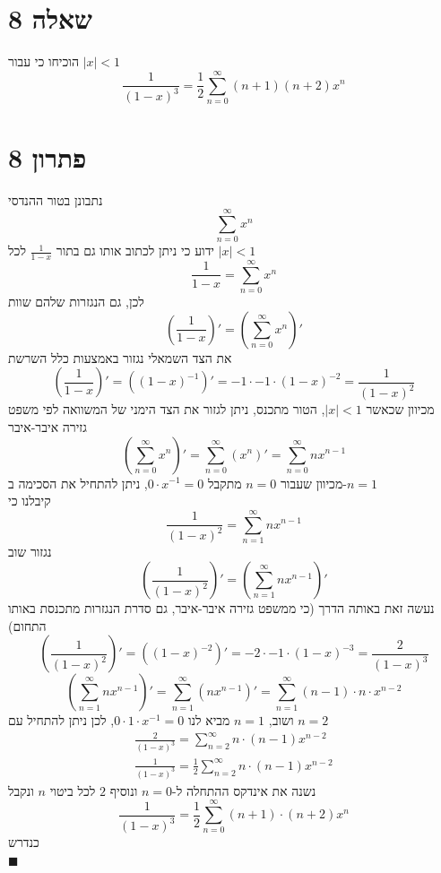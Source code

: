 \documentclass[12pt, titlepage]{article}
\begin{document}
\part*{שאלה 8}
הוכיחו כי עבור $\left|x\right| < 1$
\[
    \frac{1}{\left(1-x\right)^3} = \frac{1}{2} \sum_{n=0}^{\infty} \left(n+1\right)\left(n+2\right) x^n
\]
\part*{פתרון 8}
נתבונן בטור ההנדסי
\[
    \sum_{n=0}^\infty x^n
\]
ידוע כי ניתן לכתוב אותו גם בתור $\frac{1}{1-x}$ לכל $\left|x\right| < 1$
\[
    \frac{1}{1-x} = \sum_{n=0}^\infty x^n
\]
לכן, גם הנגזרות שלהם שוות
\[
    \left(\frac{1}{1-x}\right)' = \left(\sum_{n=0}^\infty x^n\right)'
\]
את הצד השמאלי נגזור באמצעות כלל השרשת
\[
    \left(\frac{1}{1-x}\right)' = \left(\left(1-x\right)^{-1}\right)' = -1 \cdot -1 \cdot \left(1-x\right)^{-2} = \frac{1}{\left(1-x\right)^2}
\]
מכיוון שכאשר $\left|x\right|<1$, הטור מתכנס, ניתן לגזור את הצד הימני של המשוואה לפי משפט גזירה איבר-איבר
\[
    \left(\sum_{n=0}^\infty x^n\right)' = \sum_{n=0}^\infty \left(x^n\right)' = \sum_{n=0}^\infty n x^{n-1}
\]
מכיוון שעבור $n=0$ מתקבל $0 \cdot x^{-1}=0$, ניתן להתחיל את הסכימה ב-$n=1$\\
קיבלנו כי
\[
\frac{1}{\left(1-x\right)^2}=\sum_{n=1}^\infty n x^{n-1}
\]
נגזור שוב
\[
\left(\frac{1}{\left(1-x\right)^2}\right)'=\left(\sum_{n=1}^\infty n x^{n-1}\right)'
\]
נעשה זאת באותה הדרך (כי ממשפט גזירה איבר-איבר, גם סדרת הנגזרות מתכנסת באותו התחום)
\[
    \left(\frac{1}{\left(1-x\right)^2}\right)' = \left(\left(1-x\right)^{-2}\right)' = -2 \cdot -1 \cdot \left(1-x\right)^{-3} = \frac{2}{\left(1-x\right)^3}
\]
\[
    \left(\sum_{n=1}^\infty n x^{n-1}\right)' = \sum_{n=1}^\infty \left(n x^{n-1}\right)' = \sum_{n=1}^\infty \left(n-1\right) \cdot n \cdot x^{n-2}
\]
ושוב, $n=1$ מביא לנו $0 \cdot 1 \cdot x^{-1}=0$, לכן ניתן להתחיל עם $n=2$
\begin{gather*}
    \frac{2}{\left(1-x\right)^3} = \sum_{n=2}^\infty n \cdot \left(n-1\right) x^{n-2}\\
    \frac{1}{\left(1-x\right)^3} = \frac{1}{2} \sum_{n=2}^\infty n \cdot \left(n-1\right) x^{n-2}
\end{gather*}
נשנה את אינדקס ההתחלה ל-$n=0$ ונוסיף $2$ לכל ביטוי $n$ ונקבל
\[
    \frac{1}{\left(1-x\right)^3} = \frac{1}{2} \sum_{n=0}^\infty \left(n+1\right) \cdot \left(n+2\right) x^{n}
\]
כנדרש\\
$\blacksquare$
\end{document}
